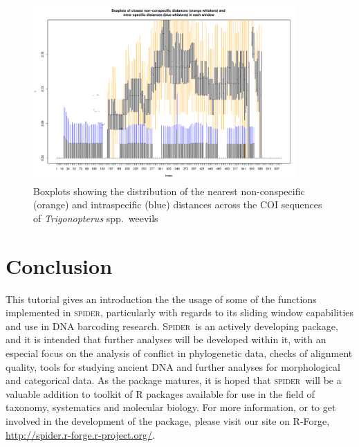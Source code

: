 \documentclass{article}
\newcommand{\spider}{\textsc{spider}} %
\newcommand{\Spider}{\textsc{Spider}} %
\newcommand{\progname}[1]{\textsc{#1}}
\begin{document}
\begin{figure}[p]
	\centering
	\includegraphics[width=0.9\textwidth]{weevilsBox}
	\caption{Boxplots showing the distribution of the nearest non-conspecific (orange) and intraspecific (blue) distances across the COI sequences of \emph{Trigonopterus} spp.\ weevils}
	\label{weevilsBox.fig}
\end{figure}


\section{Conclusion}
This tutorial gives an introduction the the usage of some of the functions implemented in \spider, particularly with regards to its sliding window capabilities and use in DNA barcoding research. 
\Spider~is an actively developing package, and it is intended that further analyses will be developed within it, with an especial focus on the analysis of conflict in phylogenetic data, checks of alignment quality, tools for studying ancient DNA and further analyses for morphological and categorical data.
As the package matures, it is hoped that \spider~will be a valuable addition to toolkit of \progname{R} packages available for use in the field of taxonomy, systematics and molecular biology. For more information, or to get involved in the development of the package, please visit our site on R-Forge, \href{http://spider.r-forge.r-project.org/}{http://spider.r-forge.r-project.org/}.




\end{document}
